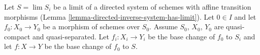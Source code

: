 \begin{situation}
\label{situation-descent-property}
Let $S = \lim S_i$ be a limit of a directed system of schemes
with affine transition morphisms
(Lemma \ref{lemma-directed-inverse-system-has-limit}).
Let $0 \in I$ and let $f_0 : X_0 \to Y_0$ be a morphism of schemes over $S_0$.
Assume $S_0$, $X_0$, $Y_0$ are quasi-compact and quasi-separated.
Let $f_i : X_i \to Y_i$ be the base change of $f_0$ to $S_i$ and
let $f : X \to Y$ be the base change of $f_0$ to $S$.
\end{situation}